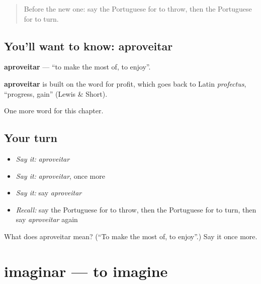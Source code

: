 \label{lesson:PT-C142-aproveitar}



\begin{quote}
Before the new one: say the Portuguese for to throw, then the Portuguese for to turn.
\end{quote}

\subsection*{You'll want to know: aproveitar}
\textbf{aproveitar} — \textquotedblleft{}to make the most of, to enjoy\textquotedblright{}.

\begin{cousinweb}
\textbf{aproveitar} is built on the word for profit, which goes back to Latin \emph{profectus}, \textquotedblleft{}progress, gain\textquotedblright{} (Lewis \& Short).
\end{cousinweb}

\begin{grammarlens}[title={What you've built}]
One more word for this chapter.
\end{grammarlens}

\subsection*{Your turn}
\begin{itemize}
\raggedright
  \item \emph{Say it:} \emph{aproveitar}
  \item \emph{Say it:} \emph{aproveitar}, once more
  \item \emph{Say it:} say \emph{aproveitar}
  \item \emph{Recall:} say the Portuguese for to throw, then the Portuguese for to turn, then say \emph{aproveitar} again
\end{itemize}

\begin{tcolorbox}[breakable,colback=teal!4,colframe=teal!35!black,title={Before you move on}]
What does aproveitar mean? (\textquotedblleft{}To make the most of, to enjoy\textquotedblright{}.) Say it once more.
\end{tcolorbox}
\section[imaginar]{imaginar — to imagine}

\label{lesson:PT-C142-imaginar}



